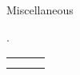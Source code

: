\divLine

\flushleft \begin{minipage}[t]{\dateColWidth}
Miscellaneous
\end{minipage}
\begin{minipage}[t]{0.8\textwidth}.
	\begin{tabular}{ C{\skillsColWidth} C{\skillsColWidth} C{\skillsColWidth} }
		 &
		 &
		 \\
		 &
		 &
	\end{tabular}
\end{minipage}








